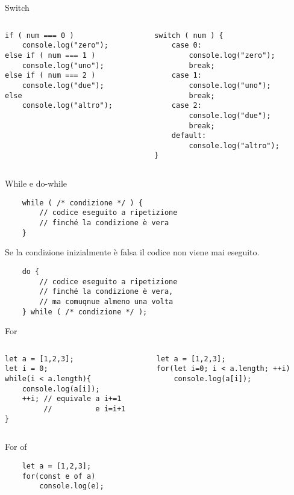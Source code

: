 \begin{frame}[fragile]{Switch}\transfade\centering
  \begin{columns}
    \begin{column}{.5\textwidth}
      \begin{verbatim}
if ( num === 0 )
    console.log("zero");
else if ( num === 1 )
    console.log("uno");
else if ( num === 2 )
    console.log("due");
else
    console.log("altro");
      \end{verbatim}
    \end{column}
    \pause
    \begin{column}{.5\textwidth}
      \begin{verbatim}
switch ( num ) {
    case 0:
        console.log("zero");
        break;
    case 1:
        console.log("uno");
        break;
    case 2:
        console.log("due");
        break;
    default:
        console.log("altro");
}
      \end{verbatim}
    \end{column}
  \end{columns}
\end{frame}

\begin{frame}[fragile]{While e do-while}\transfade\centering
  \begin{verbatim}
    while ( /* condizione */ ) {
        // codice eseguito a ripetizione
        // finché la condizione è vera
    }
  \end{verbatim}
  Se la condizione inizialmente è falsa il codice non viene mai eseguito.
  \pause\bigskip
  \begin{verbatim}
    do {
        // codice eseguito a ripetizione
        // finché la condizione è vera,
        // ma comuqnue almeno una volta
    } while ( /* condizione */ );
  \end{verbatim}
\end{frame}

\begin{frame}[fragile]{For}\transfade\centering
  \begin{columns}
    \begin{column}{.5\textwidth}
      \begin{verbatim}
let a = [1,2,3];
let i = 0;
while(i < a.length){
    console.log(a[i]);
    ++i; // equivale a i+=1
         //          e i=i+1
}
      \end{verbatim}
    \end{column}
    \pause
    \begin{column}{.5\textwidth}
      \begin{verbatim}
let a = [1,2,3];
for(let i=0; i < a.length; ++i)
    console.log(a[i]);
      \end{verbatim}
    \end{column}
  \end{columns}
\end{frame}

\begin{frame}[fragile]{For of}\transfade\centering
\begin{verbatim}
    let a = [1,2,3];
    for(const e of a)
        console.log(e);
\end{verbatim}
\end{frame}